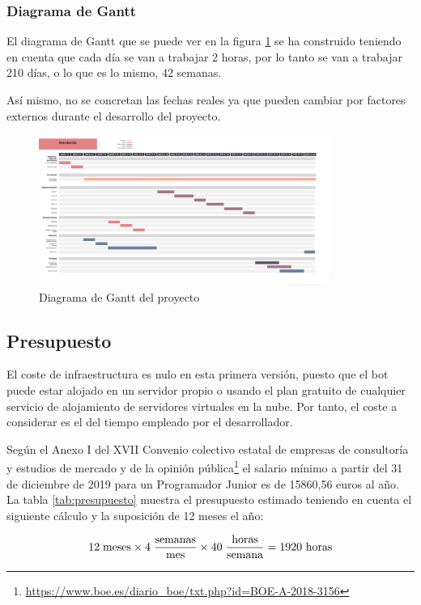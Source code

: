 \subsubsection{Diagrama de Gantt}

El diagrama de Gantt que se puede ver en la figura \ref{fig:gantt} se ha construido teniendo en cuenta que cada día se van a trabajar 2 horas, por lo tanto se van a trabajar 210 días, o lo que es lo mismo, 42 semanas.

Así mismo, no se concretan las fechas reales ya que pueden cambiar por factores externos durante el desarrollo del proyecto.

\begin{figure}[h]
\centering
\includegraphics[angle=90,origin=c,width=0.85\textwidth]{imagenes/gantt.png}
\caption{Diagrama de Gantt del proyecto}
\label{fig:gantt}
\end{figure}


\subsection{Presupuesto}

El coste de infraestructura es nulo en esta primera versión, puesto que el bot puede estar alojado en un servidor propio o usando el plan gratuito de cualquier servicio de alojamiento de servidores virtuales en la nube. Por tanto, el coste a considerar es el del tiempo empleado por el desarrollador.

Según el Anexo I del XVII Convenio colectivo estatal de empresas de consultoría y estudios de mercado y de la opinión pública\footnote{\url{https://www.boe.es/diario_boe/txt.php?id=BOE-A-2018-3156}} el salario mínimo a partir del 31 de diciembre de 2019 para un Programador Junior es de 15860,56 euros al año. La tabla \ref{tab:presupuesto} muestra el presupuesto estimado teniendo en cuenta el siguiente cálculo y la suposición de 12 meses el año:


$$12\;\textnormal{meses} \times 4\;\frac{\textnormal{semanas}}{\textnormal{mes}} \times 40\;\frac{\textnormal{horas}}{\textnormal{semana}}  = 1920 {\textnormal{ horas}}$$


